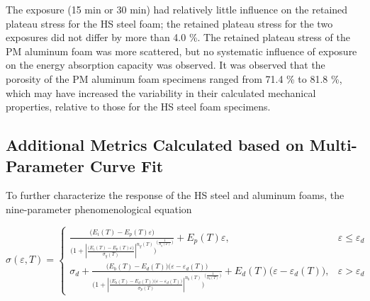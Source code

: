 \documentclass[review]{elsarticle}
\begin{document}
{The exposure (15 min or 30 min) had relatively little influence on the retained plateau stress for the HS steel foam; the retained plateau stress for the two exposures did not differ by more than 4.0 \%. The retained plateau stress of the PM aluminum foam was more scattered, but no systematic influence of exposure on the energy absorption capacity was observed. It was observed that the porosity of the PM aluminum foam specimens ranged from 71.4 \% to 81.8 \%, which may have increased the variability in their calculated mechanical properties, relative to those for the HS steel foam specimens.

\subsection{Additional Metrics Calculated based on Multi-Parameter Curve Fit}

To further characterize the response of the HS steel and aluminum foams, the nine-parameter phenomenological equation

\begin{equation}\label{Eq9}
\sigma(\varepsilon,T)=\left\{\begin{matrix}
\frac{\big(E_i(T)-E_p(T)\varepsilon\big)}{{\Bigg(1+\left | \frac{\big(E_i(T)-E_p(T)\varepsilon\big)}{\sigma_y(T)} \right |^{n_y(T)}\Bigg)}^{\Big(\frac{1}{n_y(T)}\Big)}} + E_p(T)\varepsilon, & \varepsilon\leq \varepsilon_d\\ 
\sigma_d+ \frac{\big(E_b(T)-E_d(T)\big)\big(\varepsilon-\varepsilon_d(T)\big)}{{\Bigg(1+\left | \frac{\big(E_b(T)-E_d(T)\big)\big(\varepsilon-\varepsilon_d(T)\big)}{\sigma_p(T)} \right |^{n_b(T)}\Bigg)}^{\Big(\frac{1}{n_b(T)}\Big)}} + E_d(T)\big(\varepsilon-\varepsilon_d(T)\big), & \varepsilon> \varepsilon_d 
\end{matrix}\right.
\end{equation}

}
\end{document}
